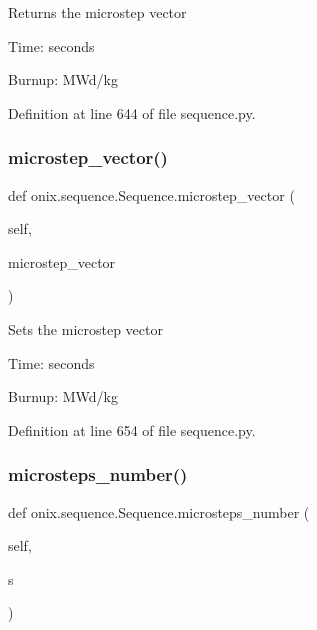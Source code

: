 \begin{DoxyVerb}Returns the microstep vector

Time: seconds

Burnup: MWd/kg
\end{DoxyVerb}
 

Definition at line 644 of file sequence.\+py.

\mbox{\label{classonix_1_1sequence_1_1Sequence_a1750acb3c5ce8469efc1c149787b1eff}} 
\subsubsection{\texorpdfstring{microstep\+\_\+vector()}{microstep\_vector()}\hspace{0.1cm}{\footnotesize\ttfamily [2/2]}}
{\footnotesize\ttfamily def onix.\+sequence.\+Sequence.\+microstep\+\_\+vector (\begin{DoxyParamCaption}\item[{}]{self,  }\item[{}]{microstep\+\_\+vector }\end{DoxyParamCaption})}

\begin{DoxyVerb}Sets the microstep vector

Time: seconds

Burnup: MWd/kg
\end{DoxyVerb}
 

Definition at line 654 of file sequence.\+py.

\mbox{\label{classonix_1_1sequence_1_1Sequence_a187bb8caa6ec692cb6302ef39020e462}} 
\subsubsection{\texorpdfstring{microsteps\+\_\+number()}{microsteps\_number()}}
{\footnotesize\ttfamily def onix.\+sequence.\+Sequence.\+microsteps\+\_\+number (\begin{DoxyParamCaption}\item[{}]{self,  }\item[{}]{s }\end{DoxyParamCaption})}


